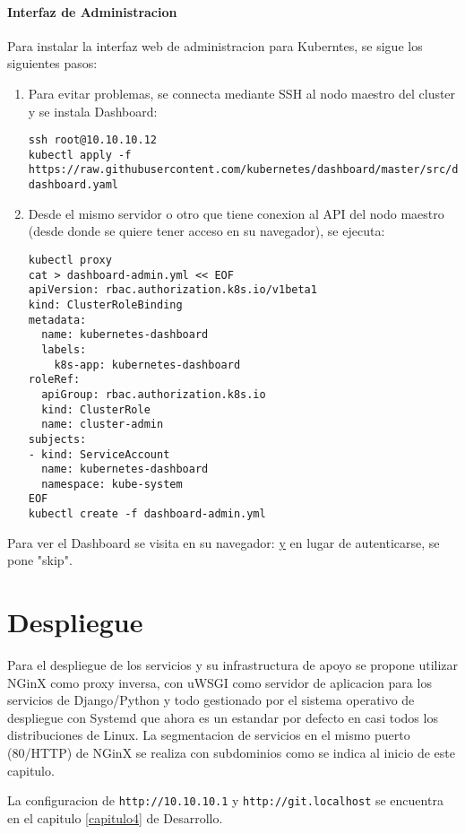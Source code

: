 \paragraph{Interfaz de Administracion}
Para instalar la interfaz web de administracion para Kuberntes, se sigue los siguientes pasos:
\begin{enumerate}
	\item Para evitar problemas, se connecta mediante SSH al nodo maestro del cluster y se instala Dashboard:
		\begin{lstlisting}
ssh root@10.10.10.12
kubectl apply -f https://raw.githubusercontent.com/kubernetes/dashboard/master/src/deploy/recommended/kubernetes-dashboard.yaml
		\end{lstlisting}
	\item Desde el mismo servidor o otro que tiene conexion al API del nodo maestro (desde donde se quiere tener acceso en su navegador), se ejecuta:
    	\begin{lstlisting}
kubectl proxy
cat > dashboard-admin.yml << EOF       
apiVersion: rbac.authorization.k8s.io/v1beta1
kind: ClusterRoleBinding
metadata:
  name: kubernetes-dashboard
  labels:
    k8s-app: kubernetes-dashboard
roleRef:
  apiGroup: rbac.authorization.k8s.io
  kind: ClusterRole
  name: cluster-admin
subjects:
- kind: ServiceAccount
  name: kubernetes-dashboard
  namespace: kube-system
EOF
kubectl create -f dashboard-admin.yml
    	\end{lstlisting}
\end{enumerate}
Para ver el Dashboard se visita en su navegador: \href{http://localhost:8001/api/v1/namespaces/kube-system/services/https:kubernetes-dashboard:/proxy/} y en lugar de autenticarse, se pone "skip".
  

\section{Despliegue}
Para el despliegue de los servicios y su infrastructura de apoyo se propone utilizar NGinX como proxy inversa, con uWSGI como servidor de aplicacion para los servicios de Django/Python y todo gestionado por el sistema operativo de despliegue con Systemd que ahora es un estandar por defecto en casi todos los distribuciones de Linux. La segmentacion de servicios en el mismo puerto (80/HTTP) de NGinX se realiza con subdominios como se indica al inicio de este capitulo.

La configuracion de \texttt{http://10.10.10.1} y \texttt{http://git.localhost} se encuentra en el capitulo \ref{capitulo4} de Desarrollo.

